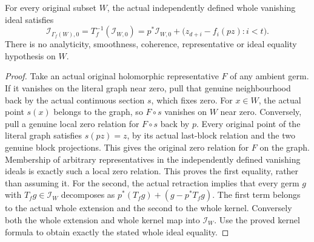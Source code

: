 \begin{theorem}
\label{hir:actual-holomorphic-graph-entire-vanishing-ideal}
\leanok
For every original subset $W$, the actual independently defined whole
vanishing ideal satisfies
\[
 \mathcal I_{\Gamma_f(W),0}=T_f^{-1}(\mathcal I_{W,0})
 =p^*\mathcal I_{W,0}+\bigl(z_{d+i}-f_i(pz):i<t\bigr).
\]
There is no analyticity, smoothness, coherence, representative or ideal
equality hypothesis on $W$.
\end{theorem}
\begin{proof}
Take an actual original holomorphic representative $F$ of any ambient
germ. If it vanishes on the literal graph near zero, pull that genuine
neighbourhood back by the actual continuous section $s$, which fixes
zero. For $x\in W$, the actual point $s(x)$ belongs to the graph, so
$F\circ s$ vanishes on $W$ near zero. Conversely, pull a genuine local
zero relation for $F\circ s$ back by $p$. Every original point of the
literal graph satisfies $s(pz)=z$, by its actual last-block relation and
the two genuine block projections. This gives the original zero relation
for $F$ on the graph. Membership of arbitrary representatives in the
independently defined vanishing ideals is exactly such a local zero
relation. This proves the first equality, rather than assuming it.
For the second, the actual retraction implies that every germ $g$ with
$T_f g\in\mathcal I_W$ decomposes as
$p^*(T_f g)+(g-p^*T_f g)$. The first term belongs to the actual whole
extension and the second to the whole kernel. Conversely both the whole
extension and whole kernel map into $\mathcal I_W$. Use the proved
kernel formula to obtain exactly the stated whole ideal equality.
\end{proof}


